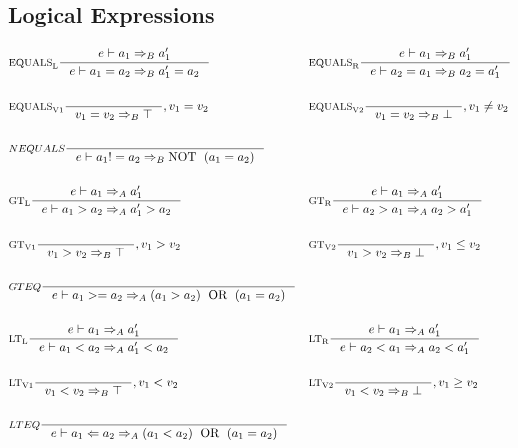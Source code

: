 \subsection{Logical Expressions}
\begin{align*}
&\inference[$\text{EQUALS}_\text{L}$]{e \vdash a_1 \Rightarrow_B a_1'}
                    {e \vdash a_1 = a_2 \Rightarrow_B a_1' = a_2}
&
&\inference[$\text{EQUALS}_\text{R}$]{e \vdash a_1 \Rightarrow_B a_1'}
                    {e \vdash a_2 = a_1 \Rightarrow_B a_2 = a_1'}
\\\\
&\inference[$\text{EQUALS}_\text{V1}$]{}
                    {v_1 = v_2 \Rightarrow_B \top}
										{, v_1 = v_2}
&
&\inference[$\text{EQUALS}_\text{V2}$]{}
                    {v_1 = v_2 \Rightarrow_B \bot}
										{, v_1 \neq v_2}
\\\\
&\inference[$NEQUALS$]{}
                    {e \vdash a_1 != a_2 \Rightarrow_B \Tnot (a_1 = a_2)}
\\\\
&\inference[$\text{GT}_\text{L}$]{e \vdash a_1 \Rightarrow_A a_1'}
                    {e \vdash a_1 > a_2 \Rightarrow_A a_1' > a_2}
&
&\inference[$\text{GT}_\text{R}$]{e \vdash a_1 \Rightarrow_A a_1'}
                    {e \vdash a_2 > a_1 \Rightarrow_A a_2 > a_1'}
\\\\
&\inference[$\text{GT}_\text{V1}$]{}
                    {v_1 > v_2 \Rightarrow_B \top}
										{, v_1 > v_2}
&
&\inference[$\text{GT}_\text{V2}$]{}
                    {v_1 > v_2 \Rightarrow_B \bot}
										{, v_1 \leq v_2}
\\\\
&\inference[$GTEQ$]{}
                    {e \vdash a_1 >= a_2 \Rightarrow_A (a_1 > a_2) \Tor (a_1 = a_2)}
\\\\
&\inference[$\text{LT}_\text{L}$]{e \vdash a_1 \Rightarrow_A a_1'}
                    {e \vdash a_1 < a_2 \Rightarrow_A a_1' < a_2}
&
&\inference[$\text{LT}_\text{R}$]{e \vdash a_1 \Rightarrow_A a_1'}
                    {e \vdash a_2 < a_1 \Rightarrow_A a_2 < a_1'}
\\\\
&\inference[$\text{LT}_\text{V1}$]{}
                    {v_1 < v_2 \Rightarrow_B \top}
										{, v_1 < v_2}
&
&\inference[$\text{LT}_\text{V2}$]{}
                    {v_1 < v_2 \Rightarrow_B \bot}
										{, v_1 \geq v_2}
\\\\
&\inference[$LTEQ$]{}
                    {e \vdash a_1 <= a_2 \Rightarrow_A (a_1 < a_2) \Tor (a_1 = a_2)}
\end{align*}

